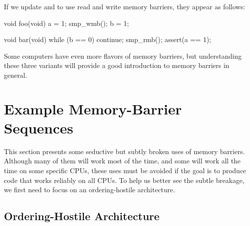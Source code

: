 \QuickQuizEnd

If we update  and  to use read and write memory
barriers, they appear as follows:

\begin{VerbatimN}[fontsize=\footnotesize,samepage=true]
void foo(void)
{
	a = 1;
	smp_wmb();
	b = 1;
}

void bar(void)
{
	while (b == 0) continue;
	smp_rmb();
	assert(a == 1);
}
\end{VerbatimN}

Some computers have even more flavors of memory barriers, but
understanding these three variants will provide a good introduction
to memory barriers in general.

\section{Example Memory-Barrier Sequences}
\label{sec:app:whymb:Example Memory-Barrier Sequences}

This section presents some seductive but subtly broken uses of
memory barriers.
Although many of them will work most of the time, and some will
work all the time on some specific CPUs, these uses must be avoided
if the goal is to produce code that works reliably on all CPUs.
To help us better see the subtle breakage, we first need to focus
on an ordering-hostile architecture.

\subsection{Ordering-Hostile Architecture}
\label{sec:app:whymb:Ordering-Hostile Architecture}

